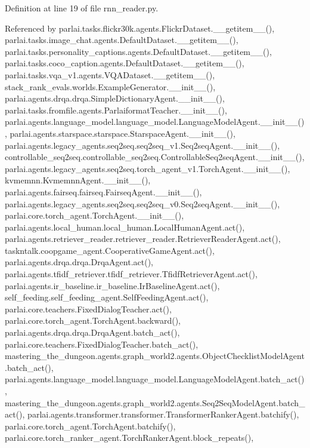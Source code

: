 Definition at line 19 of file rnn\+\_\+reader.\+py.



Referenced by parlai.\+tasks.\+flickr30k.\+agents.\+Flickr\+Dataset.\+\_\+\+\_\+getitem\+\_\+\+\_\+(), parlai.\+tasks.\+image\+\_\+chat.\+agents.\+Default\+Dataset.\+\_\+\+\_\+getitem\+\_\+\+\_\+(), parlai.\+tasks.\+personality\+\_\+captions.\+agents.\+Default\+Dataset.\+\_\+\+\_\+getitem\+\_\+\+\_\+(), parlai.\+tasks.\+coco\+\_\+caption.\+agents.\+Default\+Dataset.\+\_\+\+\_\+getitem\+\_\+\+\_\+(), parlai.\+tasks.\+vqa\+\_\+v1.\+agents.\+V\+Q\+A\+Dataset.\+\_\+\+\_\+getitem\+\_\+\+\_\+(), stack\+\_\+rank\+\_\+evals.\+worlds.\+Example\+Generator.\+\_\+\+\_\+init\+\_\+\+\_\+(), parlai.\+agents.\+drqa.\+drqa.\+Simple\+Dictionary\+Agent.\+\_\+\+\_\+init\+\_\+\+\_\+(), parlai.\+tasks.\+fromfile.\+agents.\+Parlaiformat\+Teacher.\+\_\+\+\_\+init\+\_\+\+\_\+(), parlai.\+agents.\+language\+\_\+model.\+language\+\_\+model.\+Language\+Model\+Agent.\+\_\+\+\_\+init\+\_\+\+\_\+(), parlai.\+agents.\+starspace.\+starspace.\+Starspace\+Agent.\+\_\+\+\_\+init\+\_\+\+\_\+(), parlai.\+agents.\+legacy\+\_\+agents.\+seq2seq.\+seq2seq\+\_\+v1.\+Seq2seq\+Agent.\+\_\+\+\_\+init\+\_\+\+\_\+(), controllable\+\_\+seq2seq.\+controllable\+\_\+seq2seq.\+Controllable\+Seq2seq\+Agent.\+\_\+\+\_\+init\+\_\+\+\_\+(), parlai.\+agents.\+legacy\+\_\+agents.\+seq2seq.\+torch\+\_\+agent\+\_\+v1.\+Torch\+Agent.\+\_\+\+\_\+init\+\_\+\+\_\+(), kvmemnn.\+Kvmemnn\+Agent.\+\_\+\+\_\+init\+\_\+\+\_\+(), parlai.\+agents.\+fairseq.\+fairseq.\+Fairseq\+Agent.\+\_\+\+\_\+init\+\_\+\+\_\+(), parlai.\+agents.\+legacy\+\_\+agents.\+seq2seq.\+seq2seq\+\_\+v0.\+Seq2seq\+Agent.\+\_\+\+\_\+init\+\_\+\+\_\+(), parlai.\+core.\+torch\+\_\+agent.\+Torch\+Agent.\+\_\+\+\_\+init\+\_\+\+\_\+(), parlai.\+agents.\+local\+\_\+human.\+local\+\_\+human.\+Local\+Human\+Agent.\+act(), parlai.\+agents.\+retriever\+\_\+reader.\+retriever\+\_\+reader.\+Retriever\+Reader\+Agent.\+act(), taskntalk.\+coopgame\+\_\+agent.\+Cooperative\+Game\+Agent.\+act(), parlai.\+agents.\+drqa.\+drqa.\+Drqa\+Agent.\+act(), parlai.\+agents.\+tfidf\+\_\+retriever.\+tfidf\+\_\+retriever.\+Tfidf\+Retriever\+Agent.\+act(), parlai.\+agents.\+ir\+\_\+baseline.\+ir\+\_\+baseline.\+Ir\+Baseline\+Agent.\+act(), self\+\_\+feeding.\+self\+\_\+feeding\+\_\+agent.\+Self\+Feeding\+Agent.\+act(), parlai.\+core.\+teachers.\+Fixed\+Dialog\+Teacher.\+act(), parlai.\+core.\+torch\+\_\+agent.\+Torch\+Agent.\+backward(), parlai.\+agents.\+drqa.\+drqa.\+Drqa\+Agent.\+batch\+\_\+act(), parlai.\+core.\+teachers.\+Fixed\+Dialog\+Teacher.\+batch\+\_\+act(), mastering\+\_\+the\+\_\+dungeon.\+agents.\+graph\+\_\+world2.\+agents.\+Object\+Checklist\+Model\+Agent.\+batch\+\_\+act(), parlai.\+agents.\+language\+\_\+model.\+language\+\_\+model.\+Language\+Model\+Agent.\+batch\+\_\+act(), mastering\+\_\+the\+\_\+dungeon.\+agents.\+graph\+\_\+world2.\+agents.\+Seq2\+Seq\+Model\+Agent.\+batch\+\_\+act(), parlai.\+agents.\+transformer.\+transformer.\+Transformer\+Ranker\+Agent.\+batchify(), parlai.\+core.\+torch\+\_\+agent.\+Torch\+Agent.\+batchify(), parlai.\+core.\+torch\+\_\+ranker\+\_\+agent.\+Torch\+Ranker\+Agent.\+block\+\_\+repeats(), 